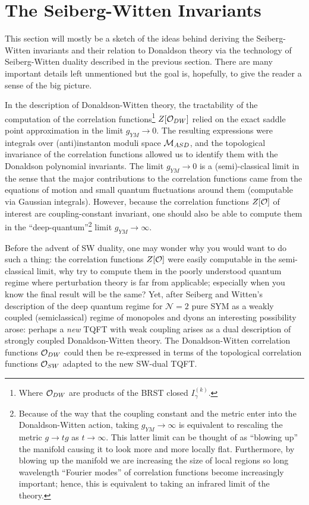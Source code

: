 \documentclass[12pt, onecolumn]{article}
\begin{document}
\section{The Seiberg-Witten Invariants}
This section will mostly be a sketch of the ideas behind deriving the Seiberg-Witten invariants and their relation to Donaldson theory via the technology of Seiberg-Witten duality described in the previous section.  There are many important details left unmentioned but the goal is, hopefully, to give the reader a sense of the big picture.

\vspace{5mm}

\noindent In the description of Donaldson-Witten theory, the tractability of the computation of the correlation functions\footnote{Where ${\cal O}_{DW}$ are products of the BRST closed $I^{(k)}_{\gamma}$.} $Z[{\cal O}_{DW}]$ relied on the exact saddle point approximation in the limit $g_{YM} \rightarrow 0$.  The resulting expressions were integrals over (anti)instanton moduli space ${\cal M}_{ASD}$, and the topological invariance of the correlation functions allowed us to identify them with the Donaldson polynomial invariants.  The limit $g_{YM} \rightarrow 0$ is a (semi)-classical limit in the sense that the major contributions to the correlation functions came from the equations of motion and small quantum fluctuations around them (computable via Gaussian integrals).  However, because the correlation functions $Z[{\cal O}]$ of interest are coupling-constant invariant, one should also be able to compute them in the ``deep-quantum''\footnote{Because of the way that the coupling constant and the metric enter into the Donaldson-Witten action, taking $g_{YM} \rightarrow \infty$ is equivalent to rescaling the metric $g \rightarrow t g$ as $t\rightarrow \infty$.  This latter limit can be thought of as ``blowing up'' the manifold causing it to look more and more locally flat.  Furthermore, by blowing up the manifold we are increasing the size of local regions so long wavelength ``Fourier modes'' of correlation functions become increasingly important; hence, this is equivalent to taking an infrared limit of the theory.} limit $g_{YM} \rightarrow \infty$.

\vspace{5mm}

\noindent Before the advent of SW duality, one may wonder why you would want to do such a thing: the correlation functions $Z[{\cal O}]$ were easily computable in the semi-classical limit, why try to compute them in the poorly understood quantum regime where perturbation theory is far from applicable; especially when you know the final result will be the same?  Yet, after Seiberg and Witten's description of the deep quantum regime for $\mathcal{N}=2$ pure SYM as a weakly coupled (semiclassical) regime of monopoles and dyons an interesting possibility arose: perhaps a \textit{new} TQFT with weak coupling arises as a dual description of strongly coupled Donaldson-Witten theory.  The Donaldson-Witten correlation functions ${\cal O}_{DW}$ could then be re-expressed in terms of the topological correlation functions ${\cal O}_{SW}$ adapted to the new SW-dual TQFT.
\end{document}
